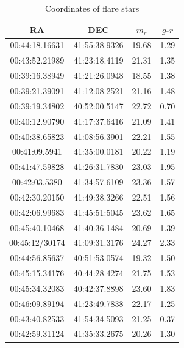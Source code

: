 \documentclass[iop, apj]{emulateapj}
\newcommand{\?}{\stackrel{?}{=}}
\begin{document}
\begin{table}[t]%
\label{tab:selecond}
    \caption{Coordinates of flare stars   \label{table:flare}}
    \begin{center}
   \begin{tabular}{cccc}
 \hline 
  RA & DEC & $m_r$ & $g$-$r$  \\
 \hline 
00:44:18.16631	&41:55:38.9326		&19.68	&1.29	\\%
00:43:52.21989	&41:23:18.4119		&21.31	&1.35	\\%
00:39:16.38949	&41:21:26.0948		&18.55 	&1.38	\\%
00:39:21.39091	&41:12:08.2521		&21.16 	&1.48	\\%
00:39:19.34802	&40:52:00.5147		&22.72 	&0.70	\\%
00:40:12.90790	&41:17:37.6416		&21.09	&1.41	\\%
00:40:38.65823	&41:08:56.3901		&22.21	&1.55	\\%
00:41:09.5941	&41:35:00.0181		&20.22 	&1.19	\\%
00:41:47.59828	&41:26:31.7830		&23.03	&1.95	\\%
00:42:03.5380	&41:34:57.6109		&23.36	&1.57	\\%
00:42:30.20150	&41:49:38.3266		&22.51	&1.56	\\%
00:42:06.99683	&41:45:51:5045		&23.62	&1.65	\\%
00:45:40.10468	&41:40:36.1484		&20.69	&1.39	\\%
00:45:12/30174	&41:09:31.3176		&24.27	&2.33	\\%
00:44:56.85637	&40:51:53.0574		&19.32 	&1.50	\\%
00:45:15.34176	&40:44:28.4274		&21.75 	&1.53	\\%
00:45:34.32083	&40:42:37.8898		&23.60 	&1.83	\\%
00:46:09.89194	&41:23:49.7838		&22.17 	&1.25	\\%
00:43:40.82533	&41:54:34.5093		&21.25 	&0.37	\\%
00:42:59.31124	&41:35:33.2675		&20.26	&1.30	\\%

\end{tabular}
\end{center}
\end{table}
\end{document}
